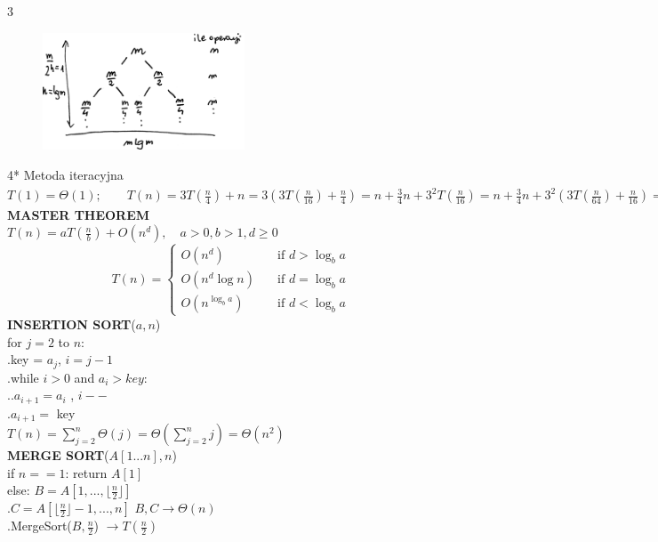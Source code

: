 \documentclass[8pt,a3paper]{article}
\begin{document}
\begin{multicols*}{3}
	\vspace{-0.8cm}
	 \begin{figure}[H]
		 	\centering
		 	\includegraphics[width=6cm]{variableTree.PNG}
	 \end{figure} 
	 \vspace{-0.7cm}
	4* Metoda iteracyjna \\
	 $T(1)=\Theta(1); \qquad T(n) = 3T(\frac{n}{4})+n = 3(3T(\frac{n}{16})+\frac{n}{4}) = n+\frac{3}{4}n+3^{2}T(\frac{n}{16}) = n+\frac{3}{4}n + 3^{2}(3T(\frac{n}{64})+\frac{n}{16})=n+\frac{3}{4}n+(\frac{3}{4})^{2}n+3^{3}T(\frac{n}{64})= n+\frac{3}{4}n+(\frac{3}{4})^{2}n+...+(3)^{\log_{4}n}*\Theta(1)= \qquad n\sum_{k\leq0}(\frac{3}{4})^{k}=\Theta(n)$ \\
	\textbf{MASTER THEOREM}\\
	$T(n) = aT(\frac{n}{b})+O(n^{d}), \quad a>0, b>1, d \geq 0$ \\
	\[ T(n) =
	\begin{cases}
	O(n^{d})    & \quad \text{if } d>\log_{b}a\\
	O(n^{d}\log n)  & \quad \text{if } d=\log_{b}a\\
	O(n^{\log_{b}a}) & \quad \text{if } d<\log_{b}a
	\end{cases}
	\]
	\textbf{INSERTION SORT}($a,n$) \\
	for $j=2$ to $n$:\\
	.\quad key = $a_{j}$, $i = j-1$ \\
	.\quad while $i>0$ and $a_{i} > key$:\\
	.\quad.\quad $a_{i+1} = a_{i}$ , $i--$ \\
	.\quad $a_{i+1} = $ key \\
	$T(n) = \sum_{j=2}^{n}\Theta(j) = \Theta(\sum_{j=2}^{n}j) = \Theta(n^{2})$ \\
	\textbf{MERGE SORT}($A[1...n],n$) \\
	if $n==1$: return $A[1]$\\
	else: $B=A[1,...,\lfloor\frac{n}{2}\rfloor] $\\
	.\qquad $C=A[\lfloor\frac{n}{2}\rfloor-1,...,n]$ {\color{BrickRed}$B,C \to \Theta(n)$}\\
	.\qquad MergeSort($B,\frac{n}{2}$) {\color{BrickRed}$\to T(\frac{n}{2})$}\\

\end{multicols*}
\end{document}
